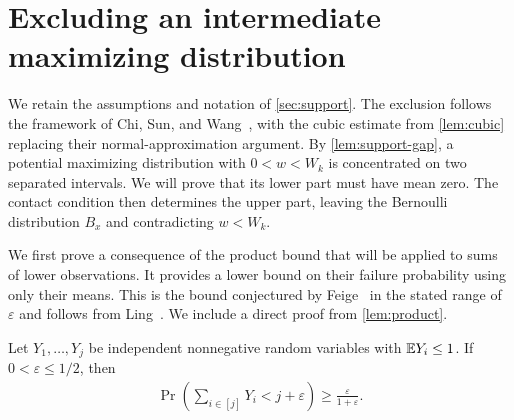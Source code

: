 \section{Excluding an intermediate maximizing distribution}\label{sec:exclusion}

We retain the assumptions and notation of \cref{sec:support}. The exclusion follows the framework of Chi, Sun, and Wang~\cite[Sections 5--6]{CSW2026}, with the cubic estimate from \cref{lem:cubic} replacing their normal-approximation argument.
By \cref{lem:support-gap}, a potential maximizing distribution with $0<w<W_k$ is concentrated on two separated intervals.
We will prove that its lower part must have mean zero.
The contact condition then determines the upper part, leaving the Bernoulli distribution $B_x$ and contradicting $w<W_k$.

We first prove a consequence of the product bound that will be applied to sums of lower observations.
It provides a lower bound on their failure probability using only their means. This is the bound conjectured by Feige~\cite{Feige2006} in the stated range of $\varepsilon$ and follows from Ling~\cite[Corollary 1.3]{Ling2026}. We include a direct proof from \cref{lem:product}.

\begin{lemma}\label{lem:small-deviation}
Let $Y_1,\ldots,Y_j$ be independent nonnegative random variables with $\mathbb E Y_i\le1$.
If $0<\varepsilon\le1/2$, then
\begin{align}
 \Pr\left(\sum_{i\in[j]}Y_i<j+\varepsilon\right)
 \ge\frac{\varepsilon}{1+\varepsilon}.
 \label{eq:small-deviation}
\end{align}
\end{lemma}

